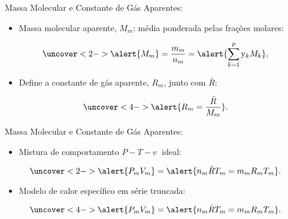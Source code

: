     \begin{frame}{Massa Molecular e Constante de Gás Aparentes:}\vspace*{-2em}
        \begin{itemize}
            \item<1-> Massa molecular aparente, \alert{$M_m$}: média ponderada pelas
                \alert{frações molares}:
        \end{itemize}
        \vspace*{0.8em}\begin{equation*}
            \uncover<2->{
                \alert{M_m} = \frac{m_m}{n_m} = \alert{\sum_{k=1}^p \mathrm{y}_k M_k},
            }
        \end{equation*}
        \begin{itemize}
            \item<3-> Define a constante de gás aparente, \alert{$R_m$}, junto com $\bar{R}$:
        \end{itemize}
        \vspace*{0.8em}\begin{equation*}
            \uncover<4->{
                \alert{R_m = \frac{\bar{R}}{M_m}}.
            }
        \end{equation*}
    \end{frame}

    \begin{frame}{Massa Molecular e Constante de Gás Aparentes:}\vspace*{-2em}
        \begin{itemize}
            \item<1-> Mistura de comportamento \alert{$P-T-v\;$ ideal}:
        \end{itemize}
        \vspace*{0.8em}\begin{equation*}
            \uncover<2->{
                \alert{P_mV_m} =
                    \alert{n_m\bar{R}T_m = m_mR_mT_m}.
            }
        \end{equation*}
        \begin{itemize}
            \item<3-> Modelo de calor específico em série truncada:
        \end{itemize}
        \vspace*{0.8em}\begin{equation*}
            \uncover<4->{
                \alert{P_mV_m} =
                    \alert{n_m\bar{R}T_m = m_mR_mT_m}.
            }
        \end{equation*}
    \end{frame}

